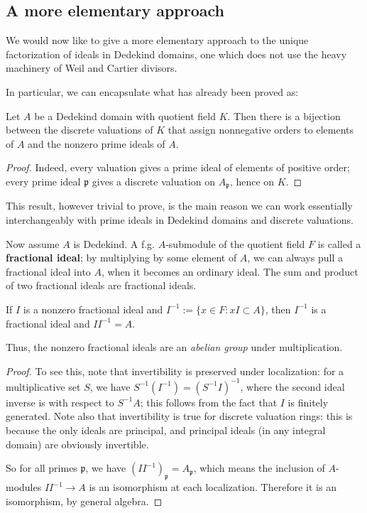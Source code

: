 \subsection{A more elementary approach}

We would now like to give  a more elementary approach to the unique
factorization of ideals in Dedekind domains, one which does not use the heavy
machinery of Weil and Cartier divisors.

In particular, we can encapsulate what has already been proved as:
\begin{theorem} Let $A$ be a Dedekind domain with quotient field $K$. Then there is a bijection between the discrete valuations of $K$ that assign nonnegative orders to elements of $A$ and the nonzero prime ideals of $A$.
\end{theorem}
\begin{proof} Indeed, every valuation gives a prime ideal of elements of positive order; every prime ideal $\mathfrak{p}$ gives a discrete valuation on $A_{\mathfrak{p}}$, hence on $K$. \end{proof}


This result, however trivial to prove, is the main reason we can work essentially interchangeably with prime ideals in Dedekind domains and discrete valuations.

Now assume  $A$ is Dedekind. A f.g. $A$-submodule of the quotient field $F$ is called a \textbf{fractional ideal}; by multiplying by some element of $A$, we can always pull a fractional ideal into $A$, when it becomes an ordinary ideal.  The sum and product of two fractional ideals are fractional ideals.

\begin{theorem}[Invertibility]  If $I$ is a nonzero fractional ideal and $ I^{-1} := \{ x \in F: xI \subset A \}$, then $I^{-1}$ is a fractional ideal and $I I^{-1} = A$.
\end{theorem}

Thus, the nonzero fractional ideals are an \emph{abelian group} under multiplication.

\begin{proof}
To see this, note that invertibility is preserved under localization: for a multiplicative set $S$, we have $S^{-1} ( I^{-1} ) = (S^{-1} I)^{-1}$, where the second ideal inverse is with respect to $S^{-1}A$; this follows from the fact that $I$ is finitely generated.  Note also that invertibility is true for discrete valuation rings: this is because the only ideals are principal, and principal ideals (in any integral domain) are obviously invertible.

So for all primes $\mathfrak{p}$, we have $(I I^{-1})_{\mathfrak{p}} = A_{\mathfrak{p}}$, which means the inclusion of $A$-modules $I I^{-1} \to A$ is an isomorphism at each localization.  Therefore it is an isomorphism, by general algebra.
\end{proof} 

